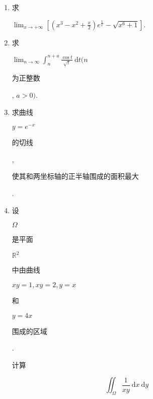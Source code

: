 \documentclass[10pt]{article}
\begin{document}
\begin{enumerate}
  \item \begin{CJK}{UTF8}{mj}求\end{CJK} $\lim _{x \rightarrow+\infty}\left[\left(x^{3}-x^{2}+\frac{x}{2}\right) e^{\frac{1}{x}}-\sqrt{x^{6}+1}\right]$.

  \item \begin{CJK}{UTF8}{mj}求\end{CJK} $\lim _{n \rightarrow \infty} \int_{n}^{n+a} \frac{\cos t}{\sqrt{t}} \mathrm{~d} t(n$ \begin{CJK}{UTF8}{mj}为正整数\end{CJK}, $a>0)$.

  \item \begin{CJK}{UTF8}{mj}求曲线\end{CJK} $y=e^{-x}$ \begin{CJK}{UTF8}{mj}的切线\end{CJK}, \begin{CJK}{UTF8}{mj}使其和两坐标轴的正半轴围成的面积最大\end{CJK}.

  \item \begin{CJK}{UTF8}{mj}设\end{CJK} $\Omega$ \begin{CJK}{UTF8}{mj}是平面\end{CJK} $\mathbb{R}^{2}$ \begin{CJK}{UTF8}{mj}中由曲线\end{CJK} $x y=1, x y=2, y=x$ \begin{CJK}{UTF8}{mj}和\end{CJK} $y=4 x$ \begin{CJK}{UTF8}{mj}围成的区域\end{CJK}. \begin{CJK}{UTF8}{mj}计算\end{CJK}

\end{enumerate}
$$
\iint_{\Omega} \frac{1}{x y} \mathrm{~d} x \mathrm{~d} y
$$
\end{document}
